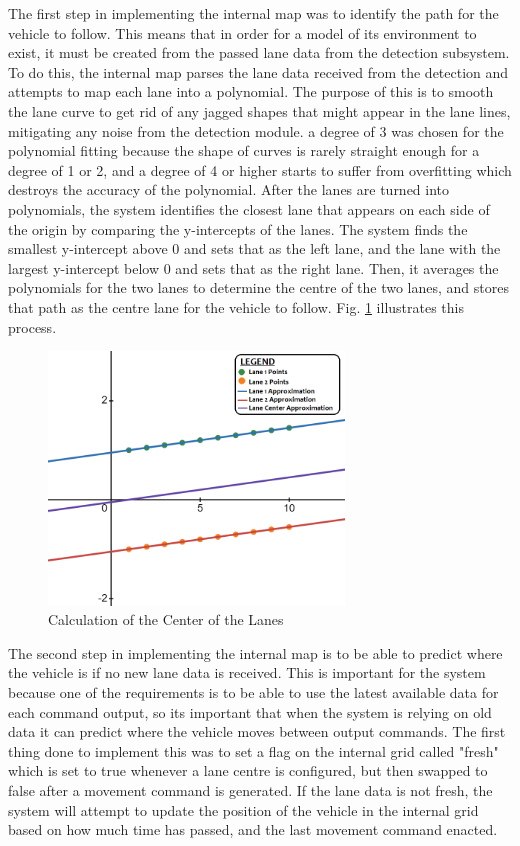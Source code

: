 \documentclass[titlepage,draft]{article}
\begin{document}
{The first step in implementing the internal map was to identify the path for the vehicle to follow. This means that in order for a model of its environment to exist, it must be created from the passed lane data from the detection subsystem. To do this, the internal map parses the lane data received from the detection and attempts to map each lane into a polynomial. The purpose of this is to smooth the lane curve to get rid of any jagged shapes that might appear in the lane lines, mitigating any noise from the detection module. a degree of 3 was chosen for the polynomial fitting because the shape of curves is rarely straight enough for a degree of 1 or 2, and a degree of 4 or higher starts to suffer from overfitting which destroys the accuracy of the polynomial. After the lanes are turned into polynomials, the system identifies the closest lane that appears on each side of the origin by comparing the y-intercepts of the lanes. The system finds the smallest y-intercept above 0 and sets that as the left lane, and the lane with the largest y-intercept below 0 and sets that as the right lane. Then, it averages the polynomials for the two lanes to determine the centre of the two lanes, and stores that path as the centre lane for the vehicle to follow. Fig. \ref{fig:lane_center_determination} illustrates this process.

\begin{figure}
	\centering
	\includegraphics[width=0.7\textwidth]{lane_center}
	\caption{Calculation of the Center of the Lanes}
	\label{fig:lane_center_determination}
\end{figure}

The second step in implementing the internal map is to be able to predict where the vehicle is if no new lane data is received. This is important for the system because one of the requirements is to be able to use the latest available data for each command output, so its important that when the system is relying on old data it can predict where the vehicle moves between output commands. The first thing done to implement this was to set a flag on the internal grid called "fresh" which is set to true whenever a lane centre is configured, but then swapped to false after a movement command is generated. If the lane data is not fresh, the system will attempt to update the position of the vehicle in the internal grid based on how much time has passed, and the last movement command enacted.

}
\end{document}
